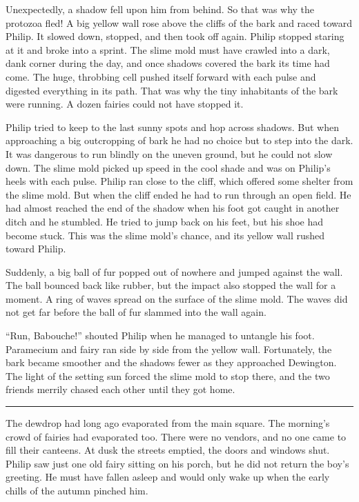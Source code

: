 \documentclass[10pt]{memoir}
\renewcommand{\pfbreakdisplay}{\bigskip \ding{166} \bigskip}
\newcommand{\secbreak}{\fancybreak{\pfbreakdisplay}}
\begin{document}
Unexpectedly, a shadow fell upon him from behind. So that was why the protozoa
fled! A big yellow wall rose above the cliffs of the bark and raced toward
Philip. It slowed down, stopped, and then took off again. Philip stopped
staring at it and broke into a sprint. The slime mold must have crawled into a
dark, dank corner during the day, and once shadows covered the bark its time
had come. The huge, throbbing cell pushed itself forward with each pulse and
digested everything in its path. That was why the tiny inhabitants of the bark
were running. A dozen fairies could not have stopped it.

Philip tried to keep to the last sunny spots and hop across shadows. But when
approaching a big outcropping of bark he had no choice but to step into the
dark. It was dangerous to run blindly on the uneven ground, but he could not
slow down. The slime mold picked up speed in the cool shade and was on Philip's
heels with each pulse. Philip ran close to the cliff, which offered some
shelter from the slime mold. But when the cliff ended he had to run through an
open field. He had almost reached the end of the shadow when his foot got
caught in another ditch and he stumbled. He tried to jump back on his feet,
but his shoe had become stuck. This was the slime mold's chance, and its yellow
wall rushed toward Philip.

Suddenly, a big ball of fur popped out of nowhere and jumped against the wall.
The ball bounced back like rubber, but the impact also stopped the wall for a
moment. A ring of waves spread on the surface of the slime mold. The waves
did not get far before the ball of fur slammed into the wall again.

``Run, Babouche!'' shouted Philip when he managed to untangle his foot.
Paramecium and fairy ran side by side from the yellow wall. Fortunately, the
bark became smoother and the shadows fewer as they approached Dewington. The
light of the setting sun forced the slime mold to stop there, and the two
friends merrily chased each other until they got home.

\secbreak

The dewdrop had long ago evaporated from the main square. The morning's crowd
of fairies had evaporated too. There were no vendors, and no one came to fill
their canteens. At dusk the streets emptied, the doors and windows shut. Philip
saw just one old fairy sitting on his porch, but he did not return the boy's
greeting. He must have fallen asleep and would only wake up when the early
chills of the autumn pinched him.
\end{document}

